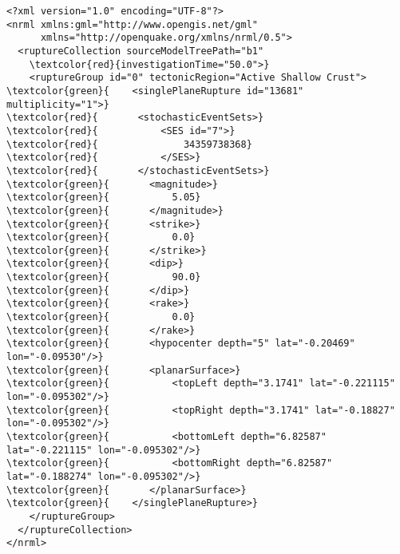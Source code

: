 \begin{Verbatim}[frame=single, commandchars=\\\{\}, fontsize=\small]
<?xml version="1.0" encoding="UTF-8"?>
<nrml xmlns:gml="http://www.opengis.net/gml"
	  xmlns="http://openquake.org/xmlns/nrml/0.5">
  <ruptureCollection sourceModelTreePath="b1"
    \textcolor{red}{investigationTime="50.0">}
    <ruptureGroup id="0" tectonicRegion="Active Shallow Crust">
\textcolor{green}{    <singlePlaneRupture id="13681" multiplicity="1">}
\textcolor{red}{       <stochasticEventSets>}
\textcolor{red}{           <SES id="7">}
\textcolor{red}{               34359738368}
\textcolor{red}{           </SES>}
\textcolor{red}{       </stochasticEventSets>}
\textcolor{green}{       <magnitude>}
\textcolor{green}{           5.05}
\textcolor{green}{       </magnitude>}
\textcolor{green}{       <strike>}
\textcolor{green}{           0.0}
\textcolor{green}{       </strike>}
\textcolor{green}{       <dip>}
\textcolor{green}{           90.0}
\textcolor{green}{       </dip>}
\textcolor{green}{       <rake>}
\textcolor{green}{           0.0}
\textcolor{green}{       </rake>}
\textcolor{green}{       <hypocenter depth="5" lat="-0.20469" lon="-0.09530"/>}
\textcolor{green}{       <planarSurface>}
\textcolor{green}{           <topLeft depth="3.1741" lat="-0.221115" lon="-0.095302"/>}
\textcolor{green}{           <topRight depth="3.1741" lat="-0.18827" lon="-0.095302"/>}
\textcolor{green}{           <bottomLeft depth="6.82587" lat="-0.221115" lon="-0.095302"/>}
\textcolor{green}{           <bottomRight depth="6.82587" lat="-0.188274" lon="-0.095302"/>}
\textcolor{green}{       </planarSurface>}
\textcolor{green}{    </singlePlaneRupture>}
    </ruptureGroup>
  </ruptureCollection>
</nrml>
\end{Verbatim}
